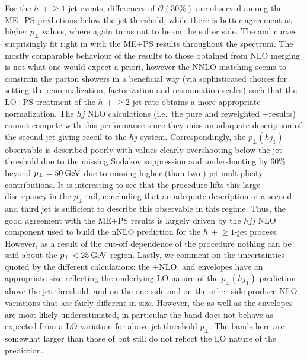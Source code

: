 For the $h\,+\!\ge\!\!1$-jet events, differences of $\mathcal{O}(30\%)$ are
observed among the ME+PS predictions below the jet threshold, while
there is better agreement at higher $p_\perp$ values, where again
\Herwig turns out to be on the softer side. The \Powheg and \Sherpa \NNLOPS 
curves surprisingly fit right in with the ME+PS results throughout 
the spectrum. The mostly comparable
behaviour of the \NNLOPS results to those obtained from NLO merging is
not what one would expect a priori, however the NNLO matching seems to
constrain the parton showers in a beneficial way (via sophisticated
choices for setting the renormalization, factorization and resummation
scales) such that the LO+PS treatment of the $h\,+\!\ge\!2$-jet rate
obtains a more appropriate normalization. The $hj$ NLO calculations
(i.e.~the pure and \Minlo reweighted \GoSam{}+\Sherpa results) cannot
compete with this performance since they miss an adaquate description 
of the second jet giving recoil to the $hj$-system.
Correspondingly, the $p_\perp(hj_1)$ observable is described poorly
with values clearly overshooting below the jet threshold due to the
missing Sudakov suppression and undershooting by 60\% beyond
$p_\perp=50\text{\:GeV}$ due to missing higher (than two-) jet multiplicity
contributions. It is interesting to see that the \Loopsim procedure
lifts this large discrepancy in the $p_\perp$ tail, concluding that 
an adequate description of a second and third jet is sufficient to 
describe this observable in this regime. Thus, the good agreement
with the ME+PS results is largely driven by the $hjj$ NLO component
used to build the nNLO prediction for the $h\,+\!\ge\!\!1$-jet
process. However, as a result of the cut-off dependence of the
procedure nothing can be said about the $p_\perp<25\text{\:GeV}$ region.
Lastly, we comment on the uncertainties quoted by the different
calculations: the \GoSam{}+\Sherpa NLO, \Minlo and \Loopsim envelopes have an
appropriate size reflecting the underlying LO nature of the
$p_\perp(hj_1)$ prediction above the jet threshold. \MGaMC and \Sherpa
\MEPSatNLO on the one side and \Herwig on the other side produce NLO
variations that are fairly different in size. However, the \Herwig as
well as the \Powheg envelopes are most likely underestimated, in
particular the \Powheg band does not behave as expected from a LO
variation for above-jet-threshold $p_\perp$. The \Sherpa \NNLOPS bands
here are somewhat larger than those of \Powheg but still do not 
reflect the LO nature of the prediction.

